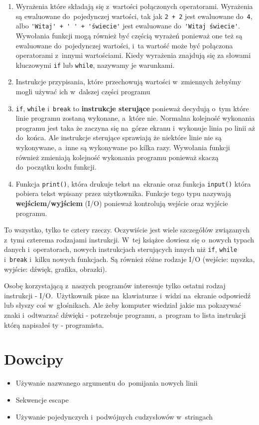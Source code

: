 \documentclass{book}
\newcommand{\btopicscovered}{
	\begin{graybox}
	\begin{itemize}
}
\newcommand{\etopicscovered}{
	\end{itemize}
	\end{graybox}
}
\begin{document}
\begin{enumerate}
\item Wyrażenia które składają się z~wartości połączonych operatorami. Wyrażenia są ewaluowane do~pojedynczej wartości, tak jak \lstinline{2 + 2} jest ewaluowane do~\lstinline{4}, albo \lstinline{'Witaj' + ' ' + 'świecie'} jest ewaluowane do~\lstinline{'Witaj świecie'}. Wywołania funkcji mogą również być częścią wyrażeń ponieważ one też są ewaluowane do~pojedynczej wartości, i~ta wartość może być połączona operatorami z~innymi wartościami. Kiedy wyrażenia znajdują się za słowami kluczowymi \lstinline{if} lub \lstinline{while}, nazywamy je warunkami.
\item Instrukcje przypisania, które przechowują wartości w~zmiennych żebyśmy mogli używać ich w~dalszej części programu
\item \lstinline{if}, \lstinline{while} i~\lstinline{break} to {\bf instrukcje sterujące} ponieważ decydują o~tym które linie programu zostaną wykonane, a~które nie. Normalna kolejność wykonania programu jest taka że zaczyna się na~górze ekranu i~wykonuje linia po linii aż do~końca. Ale instrukcje sterujące sprawiają że niektóre linie nie są wykonywane, a~inne są wykonywane po kilka razy. Wywołania funkcji również zmieniają kolejność wykonania programu ponieważ skaczą do~początku kodu funkcji.
\item Funkcja \lstinline{print()}, która drukuje tekst na~ekranie oraz funkcja \lstinline{input()} która pobiera tekst wpisany przez użytkownika. Funkcje tego typu nazywają {\bf wejściem/wyjściem} (I/O) ponieważ kontrolują wejście oraz wyjście programu.
\end{enumerate}

To wszystko, tylko te cztery rzeczy. Oczywiście jest wiele szczegółów związanych z~tymi czterema rodzajami instrukcji. W~tej książce dowiesz się o~nowych typach danych i~operatorach, nowych instrukcjach sterujących innych niż \lstinline{if}, \lstinline{while} i~\lstinline{break} i~kilku nowych funkcjach. Są również różne rodzaje I/O (wejście: myszka, wyjście: dźwięk, grafika, obrazki).

Osobę korzystającą z~naszych programów interesuje tylko ostatni rodzaj instrukcji - I/O.~Użytkownik pisze na~klawiaturze i~widzi na~ekranie odpowiedź lub słyszy coś w~głośnikach. Ale żeby komputer wiedział jakie ma pokazywać znaki i~odtwarzać dźwięki - potrzebuje programu, a~program to lista instrukcji którą napisałeś ty - programista.

\chapter{Dowcipy}
\btopicscovered
	\item Używanie nazwanego argumentu do~pomijania nowych linii
	\item Sekwencje escape
	\item Używanie pojedynczych i~podwójnych cudzysłowów w~stringach
\etopicscovered
\end{document}
